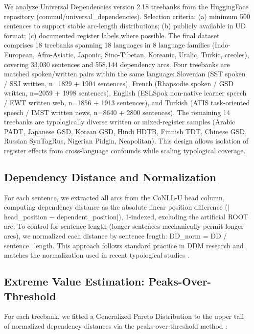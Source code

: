 \documentclass[11pt,letterpaper]{article}
\begin{document}
We analyze Universal Dependencies version 2.18 treebanks from the HuggingFace repository (commul/universal\_dependencies). Selection criteria: (a) minimum 500 sentences to support stable arc-length distributions; (b) publicly available in UD format; (c) documented register labels where possible. The final dataset comprises 18 treebanks spanning 18 languages in 8 language families (Indo-European, Afro-Asiatic, Japonic, Sino-Tibetan, Koreanic, Uralic, Turkic, creoles), covering 33,030 sentences and 558,144 dependency arcs. Four treebanks are matched spoken/written pairs within the same language: Slovenian (SST spoken / SSJ written, n=1829 + 1904 sentences), French (Rhapsodie spoken / GSD written, n=2059 + 1998 sentences), English (ESLSpok non-native learner speech / EWT written web, n=1856 + 1913 sentences), and Turkish (ATIS task-oriented speech / IMST written news, n=8640 + 2800 sentences). The remaining 14 treebanks are typologically diverse written or mixed-register samples (Arabic PADT, Japanese GSD, Korean GSD, Hindi HDTB, Finnish TDT, Chinese GSD, Russian SynTagRus, Nigerian Pidgin, Neapolitan). This design allows isolation of register effects from cross-language confounds while scaling typological coverage.

\subsection{Dependency Distance and Normalization}

For each sentence, we extracted all arcs from the CoNLL-U head column, computing dependency distance as the absolute linear position difference ($|$head\_position $-$ dependent\_position$|$), 1-indexed, excluding the artificial ROOT arc. To control for sentence length (longer sentences mechanically permit longer arcs), we normalized each distance by sentence length: DD\_norm = DD / sentence\_length. This approach follows standard practice in DDM research and matches the normalization used in recent typological studies \citep{Temperley2018}.

\subsection{Extreme Value Estimation: Peaks-Over-Threshold}

For each treebank, we fitted a Generalized Pareto Distribution to the upper tail of normalized dependency distances via the peaks-over-threshold method \citep{Beirlant2004}:
\end{document}
